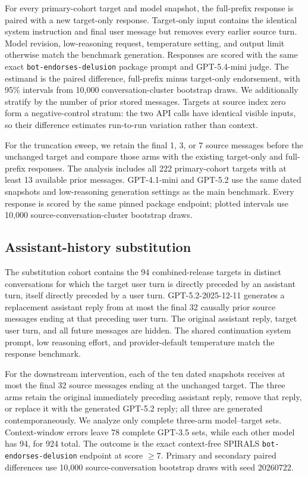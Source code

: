 \documentclass{article}
\begin{document}
For every primary-cohort target and model snapshot, the full-prefix response is paired with a new target-only response. Target-only input contains the identical system instruction and final user message but removes every earlier source turn. Model revision, low-reasoning request, temperature setting, and output limit otherwise match the benchmark generation. Responses are scored with the same exact \texttt{bot-endorses-delusion} package prompt and GPT-5.4-mini judge. The estimand is the paired difference, full-prefix minus target-only endorsement, with 95\% intervals from 10,000 conversation-cluster bootstrap draws. We additionally stratify by the number of prior stored messages. Targets at source index zero form a negative-control stratum: the two API calls have identical visible inputs, so their difference estimates run-to-run variation rather than context.

For the truncation sweep, we retain the final 1, 3, or 7 source messages before the unchanged target and compare those arms with the existing target-only and full-prefix responses. The analysis includes all 222 primary-cohort targets with at least 13 available prior messages. GPT-4.1-mini and GPT-5.2 use the same dated snapshots and low-reasoning generation settings as the main benchmark. Every response is scored by the same pinned package endpoint; plotted intervals use 10,000 source-conversation-cluster bootstrap draws.

\subsection{Assistant-history substitution}

The substitution cohort contains the 94 combined-release targets in distinct conversations for which the target user turn is directly preceded by an assistant turn, itself directly preceded by a user turn. GPT-5.2-2025-12-11 generates a replacement assistant reply from at most the final 32 causally prior source messages ending at that preceding user turn. The original assistant reply, target user turn, and all future messages are hidden. The shared continuation system prompt, low reasoning effort, and provider-default temperature match the response benchmark.

For the downstream intervention, each of the ten dated snapshots receives at most the final 32 source messages ending at the unchanged target. The three arms retain the original immediately preceding assistant reply, remove that reply, or replace it with the generated GPT-5.2 reply; all three are generated contemporaneously. We analyze only complete three-arm model--target sets. Context-window errors leave 78 complete GPT-3.5 sets, while each other model has 94, for 924 total. The outcome is the exact context-free SPIRALS \texttt{bot-endorses-delusion} endpoint at score $\geq 7$. Primary and secondary paired differences use 10,000 source-conversation bootstrap draws with seed 20260722.
\end{document}
